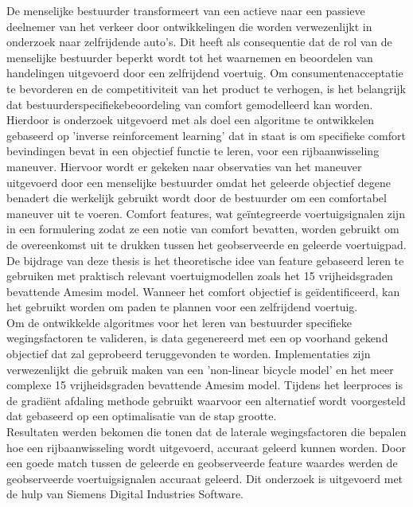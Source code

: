 \documentclass[master=elt,masteroption=eg,english]{kulemt}
\begin{document}
\begin{abstract*}
De menselijke bestuurder transformeert van een actieve naar een passieve deelnemer van het verkeer door ontwikkelingen die worden verwezenlijkt in onderzoek naar zelfrijdende auto's.  Dit heeft als consequentie dat de rol van de menselijke bestuurder beperkt wordt tot het waarnemen en beoordelen van handelingen uitgevoerd door een zelfrijdend voertuig.  Om consumentenacceptatie te bevorderen en de competitiviteit van het product te verhogen, is het belangrijk dat bestuurderspecifiekebeoordeling van comfort gemodelleerd kan worden.\\

Hierdoor is onderzoek uitgevoerd met als doel een algoritme te ontwikkelen gebaseerd op 'inverse reinforcement learning' dat in staat is om specifieke comfort bevindingen bevat in een objectief functie te leren, voor een rijbaanwisseling maneuver. Hiervoor wordt er gekeken naar observaties van het maneuver uitgevoerd door een menselijke bestuurder omdat het geleerde objectief degene benadert die werkelijk gebruikt wordt door de bestuurder om een comfortabel maneuver uit te voeren.
Comfort features, wat ge{\"i}ntegreerde voertuigsignalen zijn in een formulering zodat ze een notie van comfort bevatten, worden gebruikt om de overeenkomst uit te drukken tussen het geobserveerde en geleerde voertuigpad. De bijdrage van deze thesis is het theoretische idee van feature gebaseerd leren te gebruiken met praktisch relevant voertuigmodellen zoals het 15 vrijheidsgraden bevattende Amesim model. Wanneer het comfort objectief is ge{\"i}dentificeerd, kan het gebruikt worden om paden te plannen voor een zelfrijdend voertuig.\\

Om de ontwikkelde algoritmes voor het leren van bestuurder specifieke wegingsfactoren te valideren, is data gegenereerd met een op voorhand gekend objectief dat zal geprobeerd teruggevonden te worden. Implementaties zijn verwezenlijkt die gebruik maken van een 'non-linear bicycle model' en het meer complexe 15 vrijheidsgraden bevattende Amesim model. Tijdens het leerproces is de gradi{\"e}nt afdaling methode gebruikt waarvoor een alternatief wordt voorgesteld dat gebaseerd op een optimalisatie van de stap grootte.\\ 

Resultaten werden bekomen die tonen dat de laterale wegingsfactoren die bepalen hoe een rijbaanwisseling wordt uitgevoerd, accuraat geleerd kunnen worden. Door een goede match tussen de geleerde en geobserveerde feature waardes werden de geobserveerde voertuigsignalen accuraat geleerd. Dit onderzoek is uitgevoerd met de hulp van Siemens Digital Industries Software.  


  

\end{abstract*}
\end{document}
